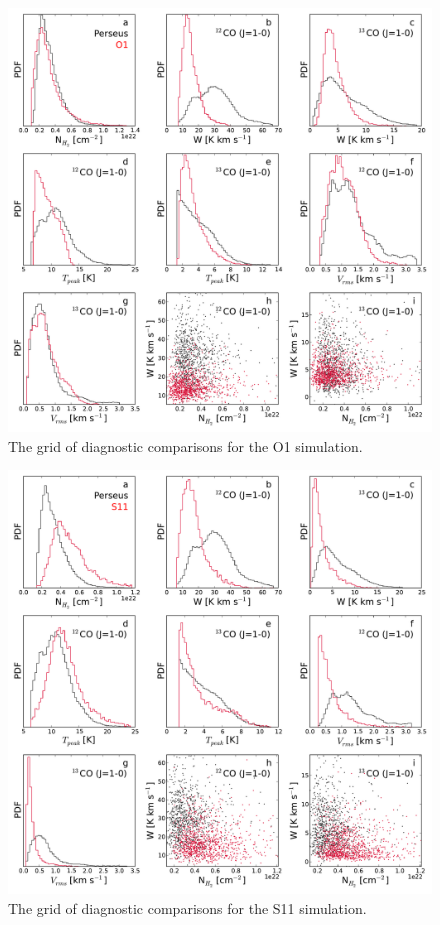 \begin{figure}
\includegraphics[width=6in]{figures/diagnostic_O1}
\caption{The grid of diagnostic comparisons for the O1 simulation.}
\label{fig:dgrid_stella}
\end{figure}

\begin{figure}
\includegraphics[width=6in]{figures/diagnostic_S11}
\caption{The grid of diagnostic comparisons for the S11 simulation.}
\label{fig:dgrid_rahul}
\end{figure}

